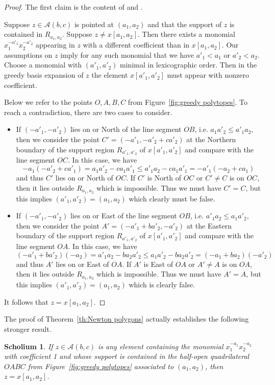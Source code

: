 \documentclass[11pt]{amsart}
\newtheorem{scholium}[theorem]{Scholium}
\theoremstyle{remark}
\numberwithin{equation}{section}
\newcommand{\cA}{\mathcal{A}}
\begin{document}
\begin{proof}
  The first claim is the content of \cite[Proposition~4.1]{LLZ} and \cite[Corollary~3.5]{LLZ2}.

  Suppose $z\in\cA(b,c)$ is pointed at $(a_1,a_2)$ and that the support of $z$ is contained in $R_{a_1,a_2}$.  Suppose $z\ne x[a_1,a_2]$.  Then there exists a monomial $x_1^{-a'_1}x_2^{-a'_2}$ appearing in $z$ with a different coefficient than in $x[a_1,a_2]$.  Our assumptions on $z$ imply for any such monomial that we have $a'_1<a_1$ or $a'_2<a_2$.  Choose a monomial with $(a'_1,a'_2)$ minimal in lexicographic order.  Then in the greedy basis expansion of $z$ the element $x[a'_1,a'_2]$ must appear with nonzero coefficient. 

  Below we refer to the points $O,A,B,C$ from Figure~\ref{fig:greedy polytopes}.  To reach a contradiction, there are two cases to consider.
  \begin{itemize}
    \item If $(-a'_1,-a'_2)$ lies on or North of the line segment $OB$, i.e. $a_1a'_2\le a'_1a_2$, then we consider the point $C'=(-a'_1,-a'_2+ca'_2)$ at the Northern boundary of the support region $R_{a'_1,a'_2}$ of $x[a'_1,a'_2]$ and compare with the line segment $OC$.  In this case, we have
    \[-a_1(-a'_2+ca'_1)=a_1a'_2-ca_1a'_1\le a'_1a_2-ca_1a'_1=-a'_1(-a_2+ca_1)\]
    and thus $C'$ lies on or North of $OC$.  If $C'$ is North of $OC$ or $C'\ne C$ is on $OC$, then it lies outside $R_{a_1,a_2}$ which is impossible.  Thus we must have $C'=C$, but this implies $(a'_1,a'_2)=(a_1,a_2)$ which clearly must be false.
    \item If $(-a'_1,-a'_2)$ lies on or East of the line segment $OB$, i.e. $a'_1a_2\le a_1a'_2$, then we consider the point $A'=(-a'_1+ba'_2,-a'_2)$ at the Eastern boundary of the support region $R_{a'_1,a'_2}$ of $x[a'_1,a'_2]$ and compare with the line segment $OA$.  In this case, we have
    \[(-a'_1+ba'_2)(-a_2)=a'_1a_2-ba_2a'_2\le a_1a'_2-ba_2a'_2=(-a_1+ba_2)(-a'_2)\]
    and thus $A'$ lies on or East of $OA$.  If $A'$ is East of $OA$ or $A'\ne A$ is on $OA$, then it lies outside $R_{a_1,a_2}$ which is impossible.  Thus we must have $A'=A$, but this implies $(a'_1,a'_2)=(a_1,a_2)$ which is clearly false.
  \end{itemize}
  It follows that $z=x[a_1,a_2]$.
\end{proof}
The proof of Theorem~\ref{th:Newton polygons} actually establishes the following stronger result.
\begin{scholium}\label{sch}
  If $z\in\cA(b,c)$ is any element containing the monomial $x_1^{-a_1}x_2^{-a_2}$ with coefficient 1 and whose support is contained in the half-open quadrilateral $OABC$ from Figure~\ref{fig:greedy polytopes} associated to $(a_1,a_2)$, then $z=x[a_1,a_2]$. 
\end{scholium}
\end{document}
